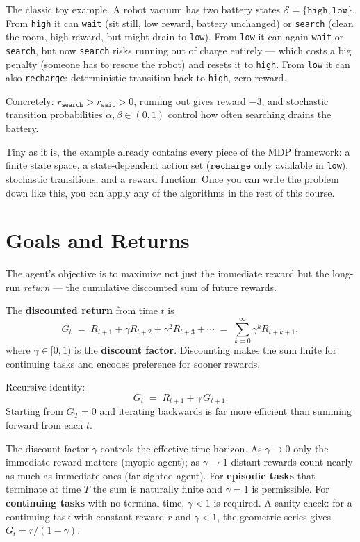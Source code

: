 \documentclass[11pt, oneside]{book}
\newcommand{\Sset}{\mathcal{S}}          %
\begin{document}
\begin{exbox}[title={A Cleaning Robot as a tiny MDP}]
The classic toy example.
A robot vacuum has two battery states $\Sset = \{\texttt{high}, \texttt{low}\}$.
From \texttt{high} it can \texttt{wait} (sit still, low reward, battery unchanged) or
\texttt{search} (clean the room, high reward, but might drain to \texttt{low}).
From \texttt{low} it can again \texttt{wait} or \texttt{search}, but now \texttt{search}
risks running out of charge entirely --- which costs a big penalty (someone has to
rescue the robot) and resets it to \texttt{high}. From \texttt{low} it can also
\texttt{recharge}: deterministic transition back to \texttt{high}, zero reward.

Concretely: $r_{\texttt{search}} > r_{\texttt{wait}} > 0$, running out gives reward $-3$,
and stochastic transition probabilities $\alpha, \beta \in (0,1)$ control how often
searching drains the battery.

Tiny as it is, the example already contains every piece of the MDP framework: a finite
state space, a state-dependent action set ($\texttt{recharge}$ only available in
\texttt{low}), stochastic transitions, and a reward function. Once you can write the
problem down like this, you can apply any of the algorithms in the rest of this course.
\end{exbox}

\section{Goals and Returns}

The agent's objective is to maximize not just the immediate reward but the long-run
\emph{return} --- the cumulative discounted sum of future rewards.

\begin{defbox}[title={Discounted Return}]
The \textbf{discounted return} from time $t$ is
\[
  G_t \;=\; R_{t+1} + \gamma R_{t+2} + \gamma^2 R_{t+3} + \cdots
        \;=\; \sum_{k=0}^{\infty} \gamma^k R_{t+k+1},
\]
where $\gamma \in [0,1)$ is the \textbf{discount factor}.
Discounting makes the sum finite for continuing tasks and encodes preference for
sooner rewards.

\medskip
Recursive identity:
\[
  G_t \;=\; R_{t+1} + \gamma\, G_{t+1}.
\]
Starting from $G_T = 0$ and iterating backwards is far more efficient than summing
forward from each $t$.
\end{defbox}

The discount factor $\gamma$ controls the effective time horizon.
As $\gamma \to 0$ only the immediate reward matters (myopic agent); as $\gamma \to 1$
distant rewards count nearly as much as immediate ones (far-sighted agent).
For \textbf{episodic tasks} that terminate at time $T$ the sum is naturally finite
and $\gamma = 1$ is permissible.
For \textbf{continuing tasks} with no terminal time, $\gamma < 1$ is required.
A sanity check: for a continuing task with constant reward $r$ and $\gamma < 1$,
the geometric series gives $G_t = r/(1-\gamma)$.
\end{document}
